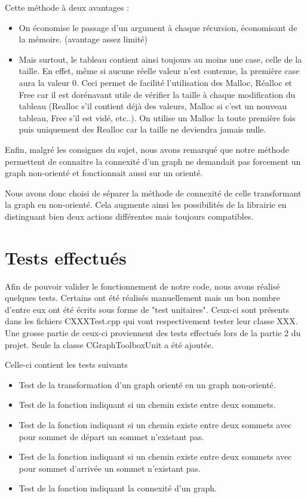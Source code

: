 		Cette méthode à deux avantages :
		\begin{itemize}
			\item On économise le passage d'un argument à chaque récursion, économisant de la mémoire. (avantage assez limité)
			\item Mais surtout, le tableau contient ainsi toujours au moins une case, celle de la taille. En effet, même si aucune réelle valeur n'est contenue, la première case aura la valeur 0. Ceci permet de facilité l'utilisation des Malloc, Réalloc et Free car il est dorénavant utile de vérifier la taille à chaque modification du tableau (Realloc s'il contient déjà des valeurs, Malloc si c'est un nouveau tableau, Free s'il est vidé, etc..). On utilise un Malloc la toute première fois puis uniquement des Realloc car la taille ne deviendra jamais nulle.\\
		\end{itemize}
		
		Enfin, malgré les consignes du sujet, nous avons remarqué que notre méthode permettent de connaitre la connexité d'un graph ne demandait pas forcement un graph non-orienté et fonctionnait aussi sur un orienté.
		
		Nous avons donc choisi de séparer la méthode de connexité de celle transformant la graph en non-orienté. Cela augmente ainsi les possibilités de la librairie en distinguant bien deux actions différentes mais toujours compatibles.
		
	\chapter{Tests effectués}
		Afin de pouvoir valider le fonctionnement de notre code, nous avons réalisé quelques tests. Certains ont été réalisés manuellement mais un bon nombre d'entre eux ont été écrits sous forme de "test unitaires". Ceux-ci sont présents dans les fichiers CXXXTest.cpp qui vont respectivement tester leur classe XXX. Une grosse partie de ceux-ci proviennent des tests effectués lors de la partie 2 du projet. Seule la classe CGraphToolboxUnit a été ajoutée.
		
		Celle-ci contient les tests suivants
		\begin{itemize}
			\item Test de la transformation d'un graph orienté en un graph non-orienté.
			\item Test de la fonction indiquant si un chemin existe entre deux sommets.
			\item Test de la fonction indiquant si un chemin existe entre deux sommets avec pour sommet de départ un sommet n'existant pas.
			\item Test de la fonction indiquant si un chemin existe entre deux sommets avec pour sommet d'arrivée un sommet n'existant pas.
			\item Test de la fonction indiquant la connexité d'un graph.
		\end{itemize}
		
